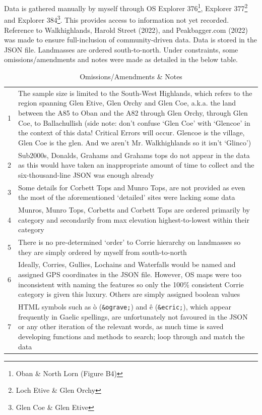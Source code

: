 \documentclass[11pt, english]{article}
\begin{document}
	Data is gathered manually by myself through OS Explorer 376\footnote{Oban \& North Lorn (Figure B4)}, Explorer 377\footnote{Loch Etive \& Glen Orchy} and Explorer 384\footnote{Glen Coe \& Glen Etive}. This provides access to information not yet recorded. Reference to Walkhighlands, Harold Street (2022), and Peakbagger.com (2022) was made to ensure full-inclusion of community-driven data. Data is stored in the JSON file. Landmasses are ordered south-to-north. Under constraints, some omissions/amendments and notes were made as detailed in the below table.

	\begin{table}[h]
		\scriptsize
		\renewcommand{\arraystretch}{1.25}
	\begin{center}
	\begin{tabular}{r|p{12cm}}
		\hline
		\hline
		1 & The sample size is limited to the South-West Highlands, which refers to the region spanning Glen Etive, Glen Orchy and Glen Coe, a.k.a. the land between the A85 to Oban and the A82 through Glen Orchy, through Glen Coe, to Ballachullish (side note: don't confuse `Glen Coe' with `Glencoe' in the context of this data! Critical Errors will occur. Glencoe is the village, Glen Coe is the glen. And we aren't Mr. Walkhighlands so it isn't `Glinco')\\
		2 & Sub2000s, Donalds, Grahams and Grahams tops do not appear in the data as this would have taken an inappropriate amount of time to collect and the six-thousand-line JSON was enough already\\
		3 & Some details for Corbett Tops and Munro Tops, are not provided as even the most of the aforementioned `detailed' sites were lacking some data\\
		4 & Munros, Munro Tops, Corbetts and Corbett Tops are ordered primarily by category and secondarily from max elevation highest-to-lowest within their category\\
		5 & There is no pre-determined `order' to Corrie hierarchy on landmasses so they are simply ordered by myself from south-to-north\\
		6 & Ideally, Corries, Gullies, Lochains and Waterfalls would be named and assigned GPS coordinates in the JSON file. However, OS maps were too inconsistent with naming the features so only the 100\% consistent Corrie category is given this luxury. Others are simply assigned boolean values\\
		7 & HTML symbols such as \`{o} (\verb|&ograve;|) and \^{e} (\verb|&ecric;|), which appear frequently in Gaelic spellings, are unfortunately not favoured in the JSON or any other iteration of the relevant words, as much time is saved developing functions and methods to search; loop through and match the data\\
		\hline
		\hline
	\end{tabular}
		\caption{Omissions/Amendments \& Notes}
	\end{center}
	\end{table}
\end{document}
